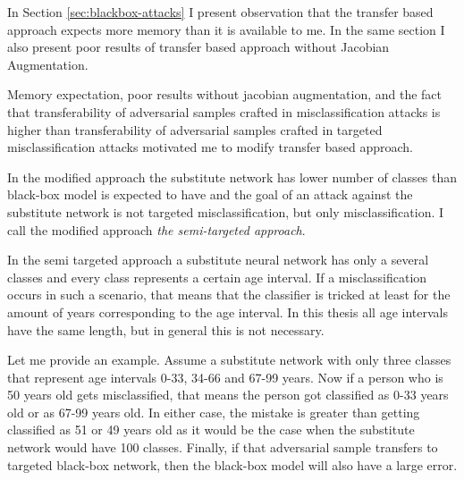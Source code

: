 In Section \ref{sec:blackbox-attacks} I present observation that the transfer based approach expects more memory than it is available to me. In the same section I also present poor results of transfer based approach without Jacobian Augmentation.

Memory expectation, poor results without jacobian augmentation, and the fact that transferability of adversarial samples crafted in misclassification attacks is higher than transferability of adversarial samples crafted in targeted misclassification attacks \cite{ensemble-attack} motivated me to modify transfer based approach.

In the modified approach the substitute network has lower number of classes than black-box model is expected to have and the goal of an attack against the substitute network is not targeted misclassification, but only misclassification. I call the modified approach \textit{the semi-targeted approach}.

In the semi targeted approach a substitute neural network has only a several classes and every class represents a certain age interval. If a misclassification occurs in such a scenario, that means that the classifier is tricked at least for the amount of years corresponding to the age interval. In this thesis all age intervals have the same length, but in general this is not necessary.

Let me provide an example. Assume a substitute network with only three classes that represent age intervals 0-33, 34-66 and 67-99 years. Now if a person who is 50 years old gets misclassified, that means the person got classified as 0-33 years old or as 67-99 years old. In either case, the mistake is greater than getting classified as 51 or 49 years old as it would be the case when the substitute network would have 100 classes. Finally, if that adversarial sample transfers to targeted black-box network, then the black-box model will also have a large error.

